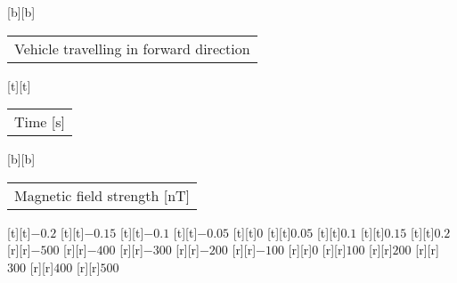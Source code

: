 %
[b][b]{\fontsize{8}{12}\selectfont \setlength{\tabcolsep}{0pt}\begin{tabular}{c}Vehicle travelling in forward direction\end{tabular}}%
[t][t]{\fontsize{8}{12}\selectfont \setlength{\tabcolsep}{0pt}\begin{tabular}{c}Time [s]\end{tabular}}%
[b][b]{\fontsize{8}{12}\selectfont \setlength{\tabcolsep}{0pt}\begin{tabular}{c}Magnetic field strength [nT]\end{tabular}}%
%
\fontsize{6}{12}%
\selectfont%
%
[t][t]{$-0.2$}%
[t][t]{$-0.15$}%
[t][t]{$-0.1$}%
[t][t]{$-0.05$}%
[t][t]{$0$}%
[t][t]{$0.05$}%
[t][t]{$0.1$}%
[t][t]{$0.15$}%
[t][t]{$0.2$}%
%
[r][r]{$-500$}%
[r][r]{$-400$}%
[r][r]{$-300$}%
[r][r]{$-200$}%
[r][r]{$-100$}%
[r][r]{$0$}%
[r][r]{$100$}%
[r][r]{$200$}%
[r][r]{$300$}%
[r][r]{$400$}%
[r][r]{$500$}%
%
%
